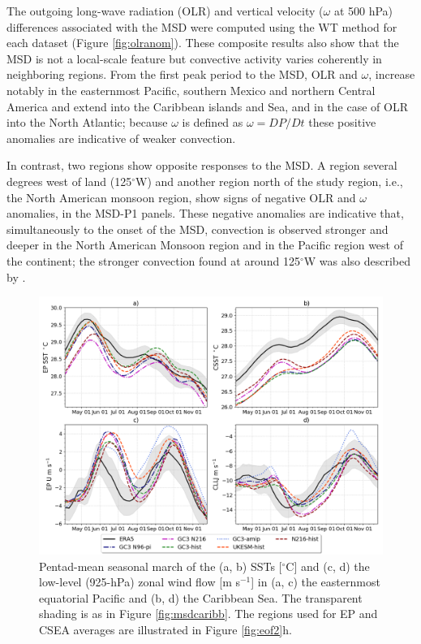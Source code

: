  The outgoing long-wave radiation (OLR) and vertical velocity ($\omega$ at 500 hPa) differences associated with the MSD were computed using the WT method for each dataset (Figure \ref{fig:olranom}). These composite results also show that the MSD is not a local-scale feature but convective activity varies coherently in neighboring regions. From the first peak period to the MSD, OLR and $\omega$, increase notably in the easternmost Pacific, southern Mexico and northern Central America and extend into the Caribbean islands and Sea, and in the case of OLR into the North Atlantic; because $\omega$ is defined as $\omega=DP/Dt$  these positive anomalies are indicative of weaker convection. 
 
 In contrast, two regions show opposite responses to the MSD. A region several degrees west of land (125$^\circ$W) and another region north of the study region, i.e., the North American monsoon region, show signs of negative OLR and $\omega$ anomalies, in the MSD-P1 panels. These negative anomalies are indicative that, simultaneously to the onset of the MSD,  convection is observed stronger and deeper in the North American Monsoon region and in the Pacific region west of the continent; the stronger convection found at around 125$^\circ$W was also described by \cite{herrera2015}. 
 
 \begin{figure}[t!]
\includegraphics[width=\linewidth]{figures/index_seasonal}
\caption[Seasonal cycle of East Pacific and Caribbean SSTs and zonal winds.]{Pentad-mean seasonal march of the (a, b) SSTs [$^\circ$C] and (c, d) the low-level (925-hPa) zonal wind flow [m s$^{-1}$] in (a, c) the easternmost equatorial Pacific and (b, d) the Caribbean Sea. The transparent shading is as in Figure \ref{fig:msdcaribb}. The regions used for EP and CSEA averages are illustrated in Figure \ref{fig:eof2}h.}
\label{fig:csst}
\end{figure}
 
